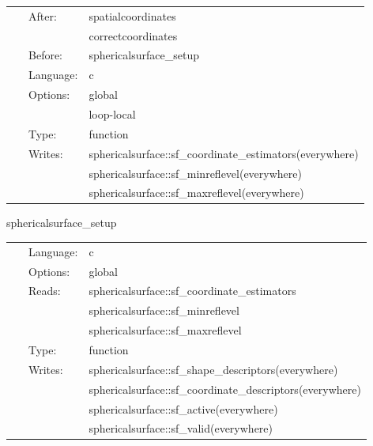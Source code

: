  \begin{tabular*}{160mm}{cll} 
~ & After:  & spatialcoordinates \\ 
~& ~ &correctcoordinates\\ 
~ & Before:  & sphericalsurface\_setup \\ 
~ & Language:  & c \\ 
~ & Options:  & global \\ 
~& ~ &loop-local\\ 
~ & Type:  & function \\ 
~ & Writes:  & sphericalsurface::sf\_coordinate\_estimators(everywhere) \\ 
~& ~ &sphericalsurface::sf\_minreflevel(everywhere)\\ 
~& ~ &sphericalsurface::sf\_maxreflevel(everywhere)\\ 
\end{tabular*} 


\vspace{5mm}


\hspace{5mm} sphericalsurface\_setup 

\hspace{5mm}{\it calculate surface coordinate descriptors } 


\hspace{5mm}

 \begin{tabular*}{160mm}{cll} 
~ & Language:  & c \\ 
~ & Options:  & global \\ 
~ & Reads:  & sphericalsurface::sf\_coordinate\_estimators \\ 
~& ~ &sphericalsurface::sf\_minreflevel\\ 
~& ~ &sphericalsurface::sf\_maxreflevel\\ 
~ & Type:  & function \\ 
~ & Writes:  & sphericalsurface::sf\_shape\_descriptors(everywhere) \\ 
~& ~ &sphericalsurface::sf\_coordinate\_descriptors(everywhere)\\ 
~& ~ &sphericalsurface::sf\_active(everywhere)\\ 
~& ~ &sphericalsurface::sf\_valid(everywhere)\\ 
\end{tabular*} 


\vspace{5mm}

